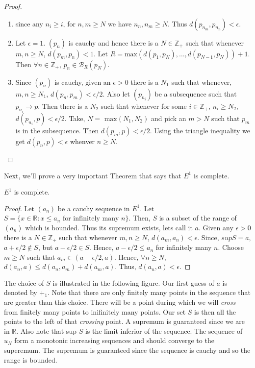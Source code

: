 \begin{proof}
    \begin{enumerate}
	\item since any $n_i \geq i$, for $n,m \geq N$ we have $n_n,n_m \geq N$. Thus
	    $d(p_{n_m},p_{n_n}) < \epsilon$.
	\item Let $\epsilon = 1$. $\left(p_n\right)$ is cauchy and hence there is a $N \in
	    \mathbb{Z}_+$ such that whenever $m,n \geq N$, $d(p_m,p_n) < 1$. Let $R = \text{
		max}(d(p_1,p_N),\dots,d(p_{N-1},p_N)) + 1$. Then $\forall n \in \mathbb{Z}_+$,
	    $p_n \in \mathcal{B}_{R}(p_N)$.
	\item Since $\left(p_n\right)$ is cauchy, given an $\epsilon > 0$ there is a $N_1$ such
	    that whenever, $m,n \geq N_1$, $d(p_n,p_m) < \epsilon/2$. Also let
	    $\left(p_{n_i}\right)$ be a subsequence such that $p_{n_i} \rightarrow p$. Then there is 
	a $N_2$ such that whenever for some $i \in \mathbb{Z}_+$, $n_i \geq N_2$, $d(p_{n_i},p) <
	\epsilon/2$. Take, $N = \text{ max}(N_1,N_2)$ and pick an $m > N$ such that $p_m$ is in the
	subsequence. Then $d(p_m,p) < \epsilon/2$. Using the triangle inequality we get $d(p_n,p) < 
	\epsilon$ whenver $n \geq N$.
    \end{enumerate}
\end{proof}
Next, we'll prove a very important Theorem that says that $E^1$ is complete.
\begin{Theorem}[name=Completeness of $E^1$]
    $E^1$ is complete.
\end{Theorem}
\begin{proof}
    Let $\left(a_n\right)$ be a cauchy sequence in $E^1$. Let $S = \left.\lbrace x \in \mathbb{R} :
	x \leq a_n \text{ for infinitely many } n \rbrace\right.$. Then, $S$ is a subset of the 
   range of $\left(a_n\right)$ which is bounded. Thus its supremum exists, lets call it $a$. Given
   any $\epsilon > 0$ there is a $N \in \mathbb{Z}_+$ such that whenever $m,n \geq N$, $d(a_m,a_n) <
   \epsilon$. Since, $sup S = a$, $a + \epsilon/2 \not \in S$, but $a - \epsilon/2 \in S$. Hence,
   $a - \epsilon/2 \leq a_n$ for infinitely many $n$. Choose $m \geq N$ such that $a_m \in
   (a-\epsilon/2 , a)$.  Hence, $\forall n \geq N$, $d(a_n,a) \leq d(a_n,a_m) + d(a_m,a)$. Thus,
   $d(a_n,a) < \epsilon$.
\end{proof}
The choice of $S$ is illustrated in the following figure. Our first guess of $a$ is denoted by 
$+_1$. Note that there are only finitely many points in the sequence that are greater than this
choice. There will be a point
during which we will \emph{cross} from finitely many points to inifinitely many points. Our set $S$
is then all the points to the left of that \emph{crossing} point. A supremum
is guaranteed since we are in $\mathbb{R}$. Also note that sup $S$ is the limit inferior of the
sequence. The sequence of $u_N$ form a monotonic increasing sequences and should converge to the
superemum. The supremum is guaranteed since the sequence is cauchy and so the range is bounded.
\newline
\newline



